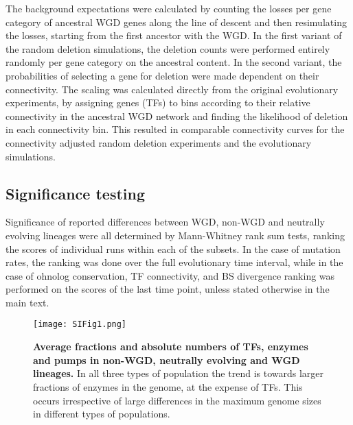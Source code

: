 The background expectations were calculated by counting the losses per gene category of ancestral WGD genes along the line of descent and then resimulating the losses, starting from the first ancestor with the WGD. In the first variant of the random deletion simulations, the deletion counts were performed entirely randomly per gene category on the ancestral content. In the second variant, the probabilities of selecting a gene for deletion were made dependent on their connectivity. The scaling was calculated directly from the original evolutionary experiments, by assigning genes (TFs) to bins according to their relative connectivity in the ancestral WGD network and finding the likelihood of deletion in each connectivity bin. This resulted in comparable connectivity curves for the connectivity adjusted random deletion experiments and the evolutionary simulations. 

\subsection{Significance testing}
Significance of reported differences between WGD, non-WGD and neutrally evolving lineages were all determined by Mann-Whitney rank sum tests, ranking the scores of individual runs within each of the subsets. In the case of mutation rates, the ranking was done over the full evolutionary time interval, while in the case of ohnolog conservation, TF connectivity, and BS divergence ranking was performed on the scores of the last time point, unless stated otherwise in the main text.





\onecolumn
\setcounter{figure}{0}
\renewcommand{\thefigure}{S\arabic{figure}}
\renewcommand{\thetable}{S\arabic{table}}
\pagebreak

\begin{figure}[htp]
 \begin{center}
 \texttt{[image: SIFig1.png]}
\end{center}
\caption{\textbf{Average fractions and absolute numbers of TFs, enzymes and pumps in non-WGD, neutrally evolving and WGD lineages.} In all three types of population the trend is towards larger fractions of enzymes in the genome, at the expense of TFs. This occurs irrespective of large differences in the maximum genome sizes in different types of populations.}
\label{SI:type_fractions} 
\end{figure} 

